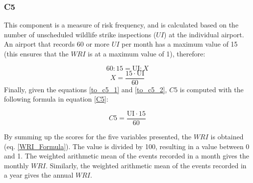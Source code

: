 \subsubsection{C5}

This component is a measure of risk frequency, and is calculated based on the number of unscheduled wildlife strike inspections ($UI$) at the individual airport.
An airport that records 60 or more $UI$ per month has a maximum value of 15 (this ensures that the $WRI$ is at a maximum value of 1), therefore:

\begin{equation}\label{to_c5_1}
60 : 15 = \mathrm{UI} : X
\end{equation}
\begin{equation}\label{to_c5_2}
 X = \frac{15 \cdot \mathrm{UI}}{60}
\end{equation}
Finally, given the equations \ref{to_c5_1} and \ref{to_c5_2}, $C5$ is computed with the following formula in equation \ref{C5}:

\begin{equation}\label{C5}
C5 = \frac{\mathrm{UI} \cdot 15}{60}
\end{equation}

\begin{table}
	\centering
	\caption{Categories of the Effect On Flight ($EOF$) provoked by wildlife strike events. The table lists in ascending order the values attributed to damage caused by wildlife events.}
	\label{tab-EOF_wri}
\end{table}

By summing up the scores for the five variables presented, the $WRI$ is obtained (eq. \ref{WRI_Formula}). The value is divided by 100, resulting in a value between 0 and 1.
The weighted arithmetic mean of the events recorded in a month gives the monthly $WRI$.
Similarly, the weighted arithmetic mean of the events recorded in a year gives the annual $WRI$.

